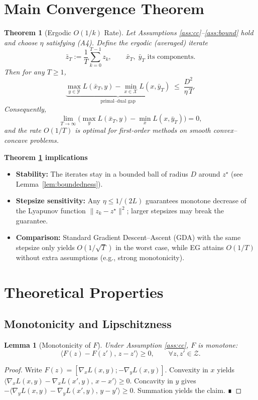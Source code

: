 \documentclass[11pt]{article}
\newtheorem{theorem}{Theorem}[section]
\newtheorem{lemma}{Lemma}[section]
\begin{document}
\section*{Main Convergence Theorem}
\begin{theorem}[Ergodic $O(1/k)$ Rate]\label{thm:rate}
Let Assumptions \ref{ass:cc}–\ref{ass:bound} hold and choose $\eta$ satisfying (A4).  
Define the \emph{ergodic} (averaged) iterate
\[
\bar z_T:=\frac{1}{T}\sum_{k=0}^{T-1}z_k,\qquad
\bar x_T,\;\bar y_T\text{ its components}.
\]
Then for any $T\ge 1$,
\[
\underbrace{\max_{y\in\mathcal Y}L(\bar x_T,y)-\min_{x\in\mathcal X}L(x,\bar y_T)}_{\displaystyle\text{primal–dual gap}}
\;\le\;
\frac{D^{2}}{\eta\,T}.
\tag{T1}
\]
Consequently,
\[
\lim_{T\to\infty}\bigl(\max_{y}L(\bar x_T,y)-\min_{x}L(x,\bar y_T)\bigr)=0,
\]
and the rate $O(1/T)$ is optimal for first‑order methods on smooth convex–concave problems.
\end{theorem}

\bigskip
\noindent\textbf{Theorem \ref{thm:rate} implications}
\begin{itemize}
\item \textbf{Stability:} The iterates stay in a bounded ball of radius $D$ around $z^\star$ (see Lemma~\ref{lem:boundedness}).
\item \textbf{Stepsize sensitivity:} Any $\eta\le 1/(2L)$ guarantees monotone decrease of the Lyapunov function $\|z_k-z^\star\|^2$; larger stepsizes may break the guarantee.
\item \textbf{Comparison:} Standard Gradient Descent–Ascent (GDA) with the same stepsize only yields $O(1/\sqrt{T})$ in the worst case, while EG attains $O(1/T)$ without extra assumptions (e.g., strong monotonicity).
\end{itemize}

\newpage

\section*{Theoretical Properties}
\subsection*{Monotonicity and Lipschitzness}
\begin{lemma}[Monotonicity of $F$]\label{lem:monotone}
Under Assumption \ref{ass:cc}, $F$ is monotone:
\[
\langle F(z)-F(z'),\,z-z'\rangle\ge 0,\qquad\forall z,z'\in\mathcal Z.
\]
\end{lemma}
\begin{proof}
Write $F(z)=[\nabla_x L(x,y);-\nabla_y L(x,y)]$.  
Convexity in $x$ yields $\langle\nabla_x L(x,y)-\nabla_x L(x',y),\,x-x'\rangle\ge0$.  
Concavity in $y$ gives $-\langle\nabla_y L(x,y)-\nabla_y L(x',y),\,y-y'\rangle\ge0$.  
Summation yields the claim. ∎
\end{proof}
\end{document}
